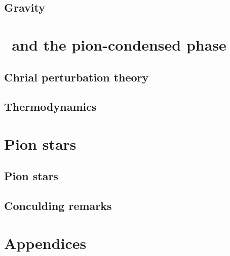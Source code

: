 \documentclass{book}
\begin{document}
    \chapter{Gravity}
    \label{chapter: GR}
    
    
    

    \part{\chpt\, and the pion-condensed phase}
    \label{part: chpt and the pion-condensed phase}

    \chapter{Chrial perturbation theory}
    \label{chapter: chpt}
    
    
    
    

    \chapter{Thermodynamics}
    \label{chapter: thermodynamics}
    
    
    
    

    \part{Pion stars}
    \label{part: pion stars}

    \chapter{Pion stars}
    \label{chapter: pion stars}
    

    \chapter{Conculding remarks}
    \label{Chapter: cocnlusion and discussion}
    

    \part*{Appendices}
    
\end{document}
